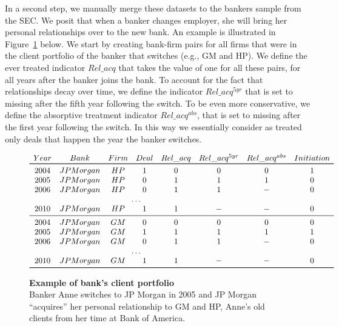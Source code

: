 In a second step, we manually merge these datasets to the bankers sample from the SEC.%
We posit that when a banker changes employer, she will bring her personal relationships over to the new bank. An example is illustrated in Figure~\ref{fig:ex_bank} below. We start by creating bank-firm pairs for all firms that were in the client portfolio of the banker that switches (e.g., GM and HP). We define the ever treated indicator $Rel\_acq$ that takes the value of one for all these pairs, for all years after the banker joins the bank. To account for the fact that relationships decay over time, we define the indicator $Rel\_acq^{5yr}$ that is set to missing after the fifth year following the switch. To be even more conservative, we define the absorptive treatment indicator $Rel\_acq^{abs}$, that is set to missing after the first year following the switch. In this way we essentially consider as treated only deals that happen the year the banker switches. 

\begin{figure}[H] \caption{\textbf{Example of bank's client portfolio} \\ Banker Anne switches to JP Morgan in 2005 and JP Morgan ``acquires'' her personal relationship to GM and HP, Anne's old clients from her time at Bank of America.} \label{fig:ex_bank}
 \begin{center}
	\( \begin{array}{cccccccc} 
	Year &  Bank & Firm & Deal & Rel\_acq & Rel\_acq^{5yr} & Rel\_acq^{abs} & Initiation \\ \toprule
	2004 & JPMorgan & HP & 1 & 0 & 0 & 0 & 1 \\
	2005 & JPMorgan & HP & 0 & 1 & 1 & 1 & 0 \\
	2006 & JPMorgan & HP & 0 & 1 & 1 & - & 0 \\
	\multicolumn{6}{c}{\ldots} \\
	2010 & JPMorgan & HP & 1 & 1 & - & - & 0 \\ \midrule 
	2004 & JPMorgan & GM & 0 & 0 & 0 & 0 & 0 \\
	2005 & JPMorgan & GM & 1 & 1 & 1 & 1 & 1 \\
	2006 & JPMorgan & GM & 0 & 1 & 1 & - & 0 \\
	\multicolumn{6}{c}{\ldots} \\
	2010 & JPMorgan & GM & 1 & 1 & - & - & 0 \\ \bottomrule
	\end{array} \) 
\end{center} \end{figure}

